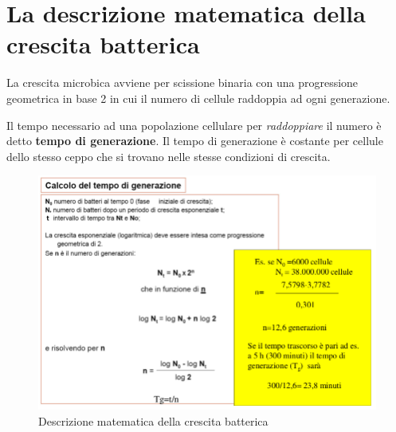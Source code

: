 \documentclass[11pt]{book}
\begin{document}
\section{La descrizione matematica della crescita batterica}
La crescita microbica avviene per scissione binaria con una progressione geometrica in base 2 in cui il numero di cellule raddoppia ad ogni generazione.

Il tempo necessario ad una popolazione cellulare per \emph{raddoppiare} il numero è detto \textbf{tempo di generazione}. Il tempo di generazione è costante per cellule dello stesso ceppo che si trovano nelle stesse condizioni di crescita.

\begin{figure}[htp]
\centering
\includegraphics[scale=0.4]{img/Descrizione matematica crescita batterica.png}
\caption{Descrizione matematica della crescita batterica}
\label{}
\end{figure}
\end{document}
